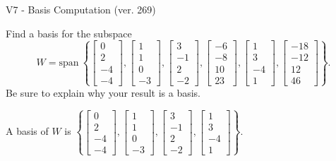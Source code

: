 \begin{exercise}
  \begin{exerciseTitle}V7 - Basis Computation (ver. 269)\end{exerciseTitle}
  \begin{exerciseStatement}
    Find a basis for the subspace 
\[W=\mathrm{span}\ \left\{\left[\begin{array}{r}
0 \\
2 \\
-4 \\
-4
\end{array}\right] , \left[\begin{array}{r}
1 \\
1 \\
0 \\
-3
\end{array}\right] , \left[\begin{array}{r}
3 \\
-1 \\
2 \\
-2
\end{array}\right] , \left[\begin{array}{r}
-6 \\
-8 \\
10 \\
23
\end{array}\right] , \left[\begin{array}{r}
1 \\
3 \\
-4 \\
1
\end{array}\right] , \left[\begin{array}{r}
-18 \\
-12 \\
12 \\
46
\end{array}\right]\right\}.\]
 Be sure to explain why your result is a basis.


  \end{exerciseStatement}
  \begin{exerciseAnswer}
   A basis of \(W\) is  \(\left\{\left[\begin{array}{r}
0 \\
2 \\
-4 \\
-4
\end{array}\right] , \left[\begin{array}{r}
1 \\
1 \\
0 \\
-3
\end{array}\right] , \left[\begin{array}{r}
3 \\
-1 \\
2 \\
-2
\end{array}\right] , \left[\begin{array}{r}
1 \\
3 \\
-4 \\
1
\end{array}\right]\right\}\).
  


  \end{exerciseAnswer}
\end{exercise}